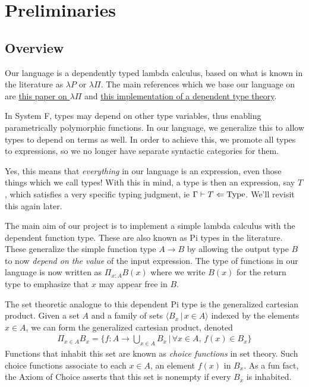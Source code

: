 \documentclass{article}
\begin{document}
\section{Preliminaries}
\subsection{Overview}
Our language is a dependently typed lambda calculus, based on what is known in
the literature as $\lambda P$ or $\lambda \Pi$.
The main references which we base our language on are
\href{https://www.andres-loeh.de/LambdaPi/LambdaPi.pdf}{this paper on $\lambda
  \Pi$} and \href{https://github.com/andrejbauer/spartan-type-theory}{this
  implementation of a dependent type theory}.

In System F, types may depend on other type variables, thus enabling
parametrically polymorphic functions. 
In our language, we generalize this to allow types to depend on terms as well.
In order to achieve this, we promote all types to expressions, so we no longer
have separate syntactic categories for them. 

Yes, this means that \textit{everything} in our language is an expression, even those
things which we call types!
With this in mind, a type is then an expression, say $T$, which satisfies a very
specific typing judgment, ie $\Gamma \vdash T \Leftarrow \operatorname{Type}$. We'll revisit
this again later.

The main aim of our project is to implement a simple lambda calculus with the
dependent function type. These are also known as Pi types in the literature.
These generalize the simple function type $A \to B$ by allowing the output type
$B$ to now \textit{depend on the value} of the input expression.
The type of functions in our language is now written as $\Pi_{x : A} B(x)$ where
we write $B(x)$ for the return type to emphasize that $x$ may appear free in
$B$.

The set theoretic analogue to this dependent Pi type is the generalized
cartesian product. Given a set $A$ and a family of sets $\langle B_x \, | \, x
\in A\rangle$ indexed by the
elements $x \in A$, we can form the generalized cartesian product, denoted
\begin{align*}
  \Pi_{x \in A} B_x = \bigg\{ f : A \rightarrow \bigcup_{x \in A} B_x \, | \, \forall x \in A, \, f(x) \in B_x \bigg\}
\end{align*}
Functions that inhabit this set are known as \textit{choice functions} in set
theory. Such choice functions associate to each $x \in A$, an element $f(x)$ in $B_x$.
As a fun fact, the Axiom of Choice asserts that this set is nonempty
if every $B_x$ is inhabited.
\end{document}
